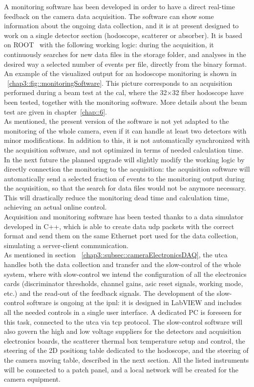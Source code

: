 A monitoring software has been developed in order to have a direct real-time feedback on the camera data acquisition. The software can show some information about the ongoing data collection, and it is at present designed to work on a single detector section (hodoscope, scatterer or absorber). It is based on ROOT~\parencite{Brun1997} with the following working logic: during the acquisition, it continuously searches for new data files in the storage folder, and analyses in the desired way a selected number of events per file, directly from the binary format. An example of the visualized output for an hodoscope monitoring is shown in \figurename~\ref{chap3::fig::monitoringSoftware}. This picture corresponds to an acquisition performed during a beam test at the \gls{cal}, where the 32$\times$32 fiber hodoscope have been tested, together with the monitoring software. More details about the beam test are given in chapter~\ref{chap::6}.\\ As mentioned, the present version of the software is not yet adapted to the monitoring of the whole camera, even if it can handle at least two detectors with minor modifications. In addition to this, it is not automatically synchronized with the acquisition software, and not optimized in terms of needed calculation time. In the next future the planned upgrade will slightly modify the working logic by directly connection the monitoring to the acquisition: the acquisition software will automatically send a selected fraction of events to the monitoring output during the acquisition, so that the search for data files would not be anymore necessary. This will drastically reduce the monitoring dead time and calculation time, achieving an actual online control.\\
Acquisition and monitoring software has been tested thanks to a data simulator developed in C++, which is able to create data \gls{udp} packets with the correct format and send them on the same Ethernet port used for the data collection, simulating a server-client communication.\\

As mentioned in section~	\ref{chap3::subsec::cameraElectronicsDAQ}, the \gls{utca} handles both the data collection and transfer and the slow-control of the whole system, where with slow-control we intend the configuration of all the electronics cards (discriminator thresholds, channel gains, \gls{asic} reset signals, working mode, etc.) and the read-out of the feedback signals. The development of the slow-control software is ongoing at the \gls{ipnl}: it is designed in LabVIEW and includes all the needed controls in a single user interface. A dedicated PC is foreseen for this task, connected to the \gls{utca} via \gls{tcp} protocol. The slow-control software will also govern the high and low voltage suppliers for the detectors and acquisition electronics boards, the scatterer thermal box temperature setup and control, the steering of the 2D positiong table dedicated to the hodoscope, and the steering of the camera moving table, described in the next section. All the listed instruments will be connected to a patch panel, and a local network will be created for the camera equipment.      

